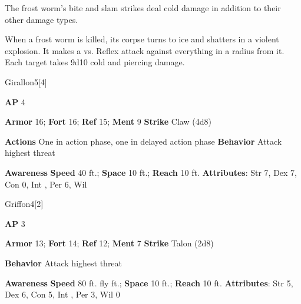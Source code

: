 The frost worm's bite and slam strikes deal cold damage in addition to their other damage types.

\vspace{0.5em}
When a frost worm is killed, its corpse turns to ice and shatters in a violent explosion.
It makes a  vs. Reflex attack against everything in a \areahuge radius from it.
\hit Each target takes 9d10 cold and piercing damage.

\begin{monsection}{Girallon}{5}[4]
\vspace{-1em}\vspace{-1em}
\begin{spellcontent}
\begin{spelltargetinginfo}
{\textbf{AP} 4}

\pari \textbf{Armor} 16;
\textbf{Fort} 16;
\textbf{Ref} 15;
\textbf{Ment} 9
\pari \textbf{Strike} Claw  (4d8)


\pari \textbf{Actions} One in action phase, one in delayed action phase
\pari \textbf{Behavior} Attack highest threat
\end{spelltargetinginfo}
\end{spellcontent}

\begin{monsterfooter}
\pari \textbf{Awareness} 
\pari \textbf{Speed} 40 ft.;
\textbf{Space} 10 ft.;
\textbf{Reach} 10 ft.
\pari \textbf{Attributes}:
Str 7,
Dex 7,
Con 0,
Int ,
Per 6,
Wil 
\end{monsterfooter}
\end{monsection}

\begin{monsection}{Griffon}{4}[2]
\vspace{-1em}\vspace{-1em}
\begin{spellcontent}
\begin{spelltargetinginfo}
{\textbf{AP} 3}

\pari \textbf{Armor} 13;
\textbf{Fort} 14;
\textbf{Ref} 12;
\textbf{Ment} 7
\pari \textbf{Strike} Talon  (2d8)



\pari \textbf{Behavior} Attack highest threat
\end{spelltargetinginfo}
\end{spellcontent}

\begin{monsterfooter}
\pari \textbf{Awareness} 
\pari \textbf{Speed} 80 ft. fly ft.;
\textbf{Space} 10 ft.;
\textbf{Reach} 10 ft.
\pari \textbf{Attributes}:
Str 5,
Dex 6,
Con 5,
Int ,
Per 3,
Wil 0
\end{monsterfooter}
\end{monsection}


